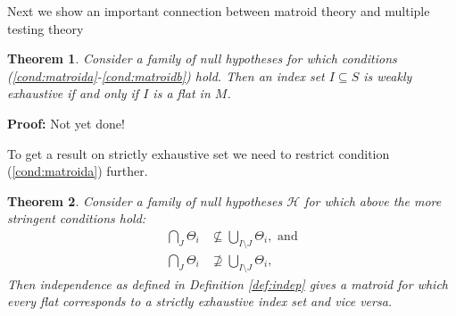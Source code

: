 \documentclass[a4paper,12pt]{article}
\newtheorem{theorem}{Theorem}
\newtheorem{comment}{Comment}
\newenvironment{proof}[1][Proof]{\noindent\textbf{#1:} }{}
\begin{document}
\begin{comment}
    testing perspective we may simple drop $H_1$ as it is simply $H_2
    \cap H_3$ which would be tested anyways.
  \item Now consider for $\delta > 0$,
    \begin{align*}
      H_1:& (\mu_1 \leq 0) &, (\mu_2 \leq 0) \\
      H_2:& \mu_1 &\leq \delta \\
      H_3:& \mu_2 &\leq \delta.
    \end{align*}
    Again, Condition \ref{cond:matroida} does not hold. However, in
    this case replacing the system by an equivalent system of null
    hypotheses is not as straight forward. A solution may be to
    replace $H_1$ by:
    \begin{align*}
      H_{1a}:& \mu_1 &\leq 0 \\
      H_{1b}:& \mu_2 &\leq 0,
    \end{align*}
  \end{itemize}
\end{comment}

Next we show an important connection between matroid theory and
multiple testing theory

\begin{theorem}
  \label{the:strictly.exhaustive}
  Consider a family of null hypotheses for which conditions
  (\ref{cond:matroida}-\ref{cond:matroidb}) hold. Then an index set $I \subseteq S$ is
  weakly exhaustive if and only if $I$ is a flat in $M$.
\end{theorem}

\begin{proof}
  Not yet done!
\end{proof}

To get a result on strictly exhaustive set we need to restrict
condition (\ref{cond:matroida}) further.

\begin{theorem}
  Consider a family of null hypotheses $\mathcal{H}$ for which above
  the more stringent conditions hold:
  \begin{align}
    \label{cond:matroid2}
    \bigcap_J \Theta_i &\nsubseteq \bigcup_{I\setminus J} \Theta_i,
    \text{ and} \\
    \bigcap_{J}\Theta_i &\nsupseteq     \bigcup_{I \setminus J} \Theta_i ,
  \end{align}
  Then independence as defined in Definition \ref{def:indep} gives a
  matroid for   which every flat corresponds to a strictly exhaustive
  index set and vice versa.
\end{theorem}
\end{document}
